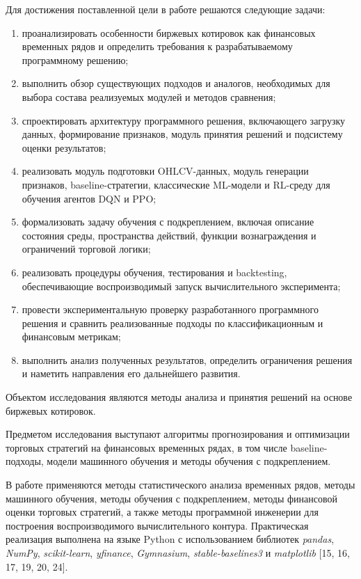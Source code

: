 Для достижения поставленной цели в работе решаются следующие задачи:
\begin{enumerate}[leftmargin=1.25cm,label=\arabic*)]
\item проанализировать особенности биржевых котировок как финансовых временных рядов и определить требования к разрабатываемому программному решению;
\item выполнить обзор существующих подходов и аналогов, необходимых для выбора состава реализуемых модулей и методов сравнения;
\item спроектировать архитектуру программного решения, включающего загрузку данных, формирование признаков, модуль принятия решений и подсистему оценки результатов;
\item реализовать модуль подготовки OHLCV-данных, модуль генерации признаков, baseline-стратегии, классические ML-модели и RL-среду для обучения агентов DQN и PPO;
\item формализовать задачу обучения с подкреплением, включая описание состояния среды, пространства действий, функции вознаграждения и ограничений торговой логики;
\item реализовать процедуры обучения, тестирования и backtesting, обеспечивающие воспроизводимый запуск вычислительного эксперимента;
\item провести экспериментальную проверку разработанного программного решения и сравнить реализованные подходы по классификационным и финансовым метрикам;
\item выполнить анализ полученных результатов, определить ограничения решения и наметить направления его дальнейшего развития.
\end{enumerate}

Объектом исследования являются методы анализа и принятия решений на основе биржевых котировок.

Предметом исследования выступают алгоритмы прогнозирования и оптимизации торговых стратегий на финансовых временных рядах, в том числе baseline-подходы, модели машинного обучения и методы обучения с подкреплением.

В работе применяются методы статистического анализа временных рядов, методы машинного обучения, методы обучения с подкреплением, методы финансовой оценки торговых стратегий, а также методы программной инженерии для построения воспроизводимого вычислительного контура. Практическая реализация выполнена на языке Python с использованием библиотек \textit{pandas}, \textit{NumPy}, \textit{scikit-learn}, \textit{yfinance}, \textit{Gymnasium}, \textit{stable-baselines3} и \textit{matplotlib} [15, 16, 17, 19, 20, 24].

